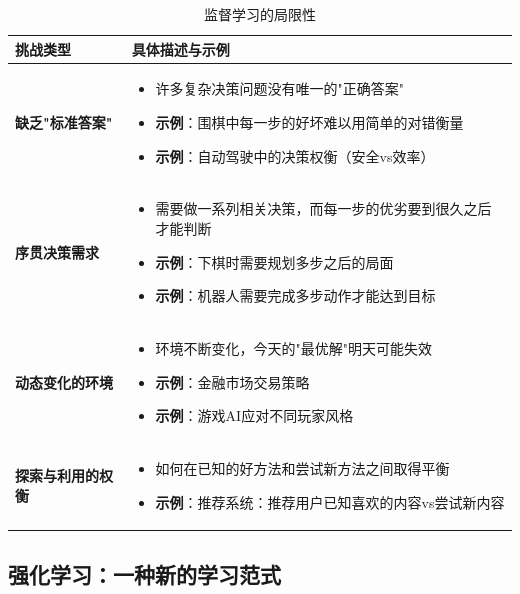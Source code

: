\begin{table}[H]
\centering
\caption{监督学习的局限性}
\begin{tabular}{p{}p{}}
\toprule
\textbf{挑战类型} & \textbf{具体描述与示例} \\
\midrule
\textbf{缺乏"标准答案"} & 
\begin{itemize}
    \item 许多复杂决策问题没有唯一的"正确答案"
    \item \textbf{示例}：围棋中每一步的好坏难以用简单的对错衡量
    \item \textbf{示例}：自动驾驶中的决策权衡（安全vs效率）
\end{itemize} \\
\hline
\textbf{序贯决策需求} & 
\begin{itemize}
    \item 需要做一系列相关决策，而每一步的优劣要到很久之后才能判断
    \item \textbf{示例}：下棋时需要规划多步之后的局面
    \item \textbf{示例}：机器人需要完成多步动作才能达到目标
\end{itemize} \\
\hline
\textbf{动态变化的环境} & 
\begin{itemize}
    \item 环境不断变化，今天的"最优解"明天可能失效
    \item \textbf{示例}：金融市场交易策略
    \item \textbf{示例}：游戏AI应对不同玩家风格
\end{itemize} \\
\hline
\textbf{探索与利用的权衡} & 
\begin{itemize}
    \item 如何在已知的好方法和尝试新方法之间取得平衡
    \item \textbf{示例}：推荐系统：推荐用户已知喜欢的内容vs尝试新内容
\end{itemize} \\
\bottomrule
\end{tabular}
\end{table}

\subsection{强化学习：一种新的学习范式}

